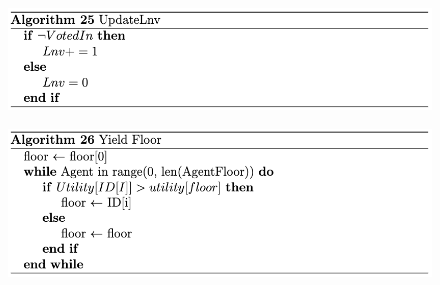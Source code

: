 
\begin{figure}[htb]
    \centering
    \includegraphics[scale=0.7]{006_team_3_agent_design/FIGS/Algo25.png}
    \label{fig:algo25}
\end{figure}



\begin{figure}[htb]
    \centering
    \includegraphics[scale=0.7]{006_team_3_agent_design/FIGS/Algo26.png}
    \label{fig:algo26}
\end{figure}



